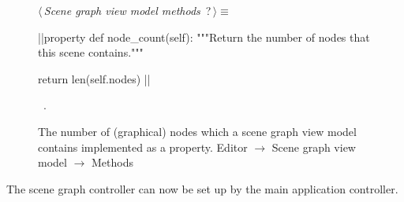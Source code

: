 \documentclass[%
    a4paper,    %
    justified,  %
    nobib,      %
    openany     %
]{tufte-book}
\makeatletter
\renewcommand{\label}[1]{\@tufte@label{##1}}%
\makeatother
\begin{document}
\begin{figure}
\begin{flushleft} \small
\begin{minipage}{\linewidth}\label{scrap38}\raggedright\small
{} $\langle\,${\itshape Scene graph view model methods}\nobreak\ {\footnotesize {?}}$\,\rangle\equiv$
\vspace{-1ex}
\begin{pythoncode}
|\normalfont{}\fontfamily{}|property
def node_count(self):
    """Return the number of nodes that this scene contains."""

    return len(self.nodes)
|\NWsep|
\end{pythoncode}
\vspace{1.5ex}
\footnotesize
\begin{list}{}{\setlength{\itemsep}{-\parsep}\setlength{\itemindent}{-\leftmargin}}
\item \NWtxtMacroRefIn\ .

\item{}
\end{list}
\end{minipage}\vspace{4ex}
\end{flushleft}
\caption{The number of (graphical) nodes which a scene graph view model contains
  implemented as a property.
  \newline{}\newline{}Editor $\rightarrow$ Scene graph view model $\rightarrow$
  Methods}
\label{editor:lst:scene-graph-view-model:methods:node-count}
\end{figure}


The scene graph controller can now be set up by the main application controller.
\end{document}
